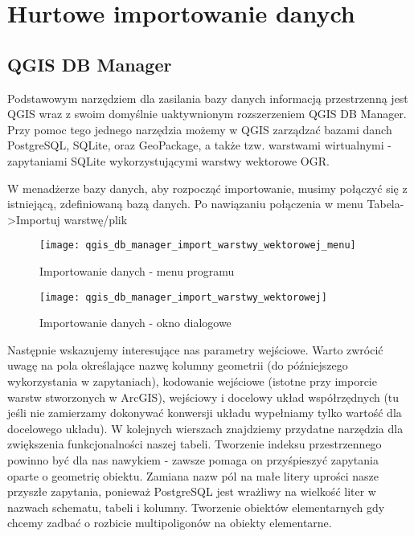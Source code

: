 \chapter{Hurtowe importowanie danych}
	\section{QGIS DB Manager}
	
Podstawowym narzędziem dla zasilania bazy danych informacją przestrzenną jest QGIS wraz z swoim domyślnie uaktywnionym rozszerzeniem QGIS DB Manager. Przy pomoc tego jednego narzędzia możemy w QGIS zarządzać bazami danch PostgreSQL, SQLite, oraz GeoPackage, a także tzw. warstwami wirtualnymi - zapytaniami SQLite wykorzystującymi warstwy wektorowe OGR.

W menadżerze bazy danych, aby rozpocząć importowanie, musimy połączyć się z istniejącą, zdefiniowaną bazą danych. Po nawiązaniu połączenia w menu \colorbox{code-gray}{Tabela->Importuj warstwę/plik}	
\begin{figure}[!ht]
	\centering
	\texttt{[image: qgis\_db\_manager\_import\_warstwy\_wektorowej\_menu]}
	\caption{Importowanie danych - menu programu}
\end{figure}

\begin{figure}[!ht]
	\centering
	\texttt{[image: qgis\_db\_manager\_import\_warstwy\_wektorowej]}
	\caption{Importowanie danych - okno dialogowe}
\end{figure}
Następnie wskazujemy interesujące nas parametry wejściowe. Warto zwrócić uwagę na pola określające nazwę kolumny geometrii (do późniejszego wykorzystania w zapytaniach), kodowanie wejściowe (istotne przy imporcie warstw stworzonych w ArcGIS), wejściowy i docelowy układ współrzędnych (tu jeśli nie zamierzamy dokonywać konwersji układu wypełniamy tylko wartość dla docelowego układu). W kolejnych wierszach znajdziemy przydatne narzędzia dla zwiększenia funkcjonalności naszej tabeli. Tworzenie indeksu przestrzennego powinno być dla nas nawykiem - zawsze pomaga on przyśpieszyć zapytania oparte o geometrię obiektu. Zamiana nazw pól na małe litery uprości nasze przyszłe zapytania, ponieważ PostgreSQL jest wrażliwy na wielkość liter w nazwach schematu, tabeli i kolumny. Tworzenie obiektów elementarnych gdy chcemy zadbać o rozbicie multipoligonów na obiekty elementarne.
	
